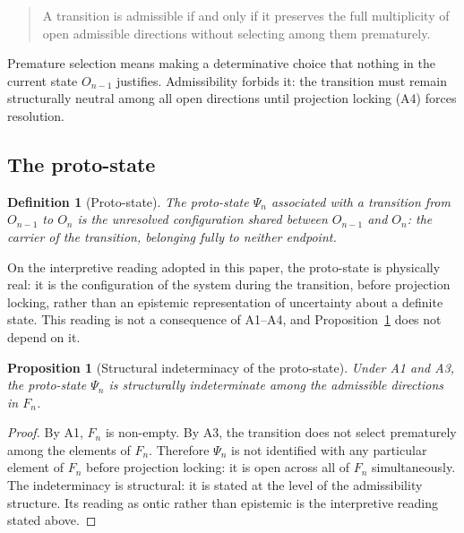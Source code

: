 \documentclass[11pt,a4paper]{article}
\newtheorem{proposition}[theorem]{Proposition}
\newtheorem{definition}[theorem]{Definition}
\begin{document}
    \begin{quote}
      A transition is admissible if and only if it preserves the full multiplicity
      of open admissible directions without selecting among them prematurely.
    \end{quote}

    Premature selection means making a determinative choice that nothing in the
    current state $O_{n-1}$ justifies.
    Admissibility forbids it: the transition must remain structurally neutral among
    all open directions until projection locking (A4) forces resolution.

  \subsection{The proto-state}
    \label{subsec:proto-state}

    \begin{definition}[Proto-state]
      \label{def:proto-state}
      The \emph{proto-state} $\Psi_n$ associated with a transition from $O_{n-1}$
      to $O_n$ is the unresolved configuration shared between $O_{n-1}$ and $O_n$:
      the carrier of the transition, belonging fully to neither endpoint.
    \end{definition}

    On the interpretive reading adopted in this paper, the proto-state is physically real: it is the
    configuration of the system during the transition, before projection locking, rather than an epistemic
    representation of uncertainty about a definite state.
    This reading is not a consequence of A1--A4, and Proposition~\ref{prop:indeterminacy} does not depend
    on it.

    \begin{proposition}[Structural indeterminacy of the proto-state]
      \label{prop:indeterminacy}
      Under A1 and A3, the proto-state $\Psi_n$ is structurally indeterminate among
      the admissible directions in $F_n$.
    \end{proposition}

    \begin{proof}
      By A1, $F_n$ is non-empty.
      By A3, the transition does not select prematurely among the elements of $F_n$.
      Therefore $\Psi_n$ is not identified with any particular element of $F_n$
      before projection locking: it is open across all of $F_n$ simultaneously.
      The indeterminacy is structural: it is stated at the level of the admissibility structure.
      Its reading as ontic rather than epistemic is the interpretive reading stated above.
    \end{proof}
\end{document}
